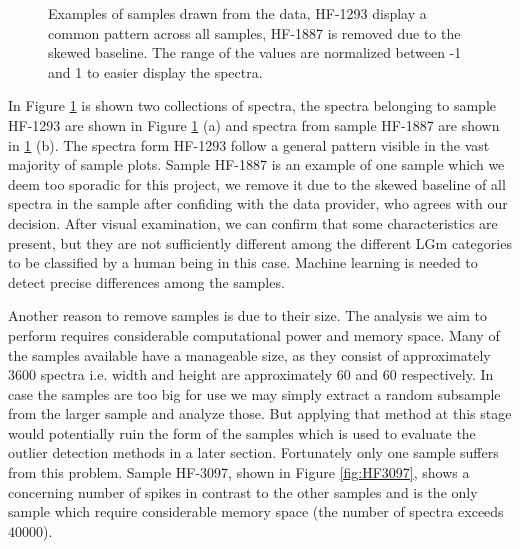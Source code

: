 \begin{figure}[h]

    \centering
    \qquad
    \caption{Examples of samples drawn from the data, HF-1293 display a common pattern across all samples, HF-1887 is removed due to the skewed baseline. The range of the values are normalized between -1 and 1 to easier display the spectra.
    \label{fig:spectrum}}%
\end{figure}

In Figure \ref{fig:spectrum} is shown two collections of spectra, the spectra belonging to sample HF-1293 are shown in Figure \ref{fig:spectrum} (a) and spectra from sample HF-1887 are shown in \ref{fig:spectrum} (b). The spectra form HF-1293 follow a general pattern visible in the vast majority of sample plots.
Sample HF-1887 is an example of one sample which we deem too sporadic for this project, we remove it due to the skewed baseline of all spectra in the sample after confiding with the data provider, who agrees with our decision. After visual examination, we can confirm that some characteristics are present, but they are not sufficiently different among the different LGm categories to be classified by a human being in this case. Machine learning is needed to detect precise differences    among the samples.

Another reason to remove samples is due to their size. The analysis we aim to perform requires considerable computational power and memory space. Many of the samples available have a manageable size, as they consist of approximately $3600$ spectra i.e. width and height are approximately $60$ and $60$ respectively. In case the samples are too big for use we may simply extract a random subsample from the larger sample and analyze those. But applying that method at this stage would potentially ruin the form of the samples which is used to evaluate the outlier detection methods in a later section. Fortunately only one sample suffers from this problem. Sample HF-3097, shown in Figure \ref{fig:HF3097}, shows a concerning number of spikes in contrast to the other samples and is the only sample which require considerable memory space (the number of spectra exceeds $40000$).

